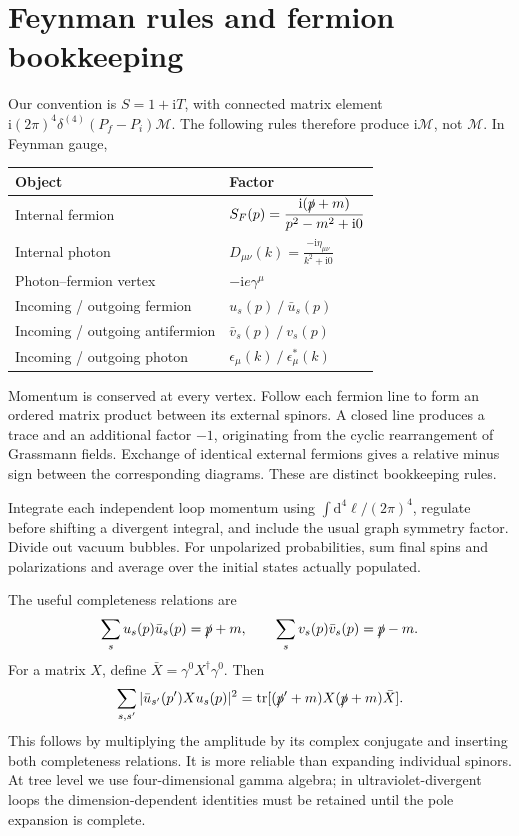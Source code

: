 \documentclass[11pt]{article}
\newcommand{\dd}{\mathrm d}
\newcommand{\ii}{\mathrm i}
\newcommand{\tr}{\operatorname{tr}}
\newcommand{\module}[1]{\clearpage\section{#1}}
\newcommand{\cM}{\mathcal M}
\begin{document}
\module{Feynman rules and fermion bookkeeping}
Our convention is \(S=1+\ii T\), with connected matrix element
\(\ii(2\pi)^4\delta^{(4)}(P_f-P_i)\cM\). The following rules therefore
produce \(\ii\cM\), not \(\cM\). In Feynman gauge,
\begin{center}
\renewcommand{\arraystretch}{1.35}
\begin{tabular}{ll}
\toprule
Object & Factor \\
\midrule
Internal fermion & \(\displaystyle S_F(p)=\frac{\ii(\slashed p+m)}{p^2-m^2+\ii0}\) \\
Internal photon & \(\displaystyle D_{\mu\nu}(k)=\frac{-\ii\eta_{\mu\nu}}{k^2+\ii0}\) \\
Photon--fermion vertex & \(-\ii e\gamma^\mu\) \\
Incoming / outgoing fermion & \(u_s(p)\ /\ \bar u_s(p)\) \\
Incoming / outgoing antifermion & \(\bar v_s(p)\ /\ v_s(p)\) \\
Incoming / outgoing photon & \(\epsilon_\mu(k)\ /\ \epsilon_\mu^*(k)\) \\
\bottomrule
\end{tabular}
\end{center}
Momentum is conserved at every vertex. Follow each fermion line to form
an ordered matrix product between its external spinors. A closed line
produces a trace and an additional factor \(-1\), originating from the
cyclic rearrangement of Grassmann fields. Exchange of identical external
fermions gives a relative minus sign between the corresponding diagrams.
These are distinct bookkeeping rules.

Integrate each independent loop momentum using
\(\int\dd^4\ell/(2\pi)^4\), regulate before shifting a divergent integral,
and include the usual graph symmetry factor. Divide out vacuum bubbles.
For unpolarized probabilities, sum final spins and polarizations and
average over the initial states actually populated.

The useful completeness relations are
\begin{equation}
 \sum_su_s(p)\bar u_s(p)=\slashed p+m,\qquad
 \sum_sv_s(p)\bar v_s(p)=\slashed p-m.
\end{equation}
For a matrix \(X\), define \(\bar X=\gamma^0X^\dagger\gamma^0\). Then
\begin{equation}
 \sum_{s,s'}|\bar u_{s'}(p')Xu_s(p)|^2
 =\tr[(\slashed p'+m)X(\slashed p+m)\bar X].
 \label{eq:spintrace}
\end{equation}
This follows by multiplying the amplitude by its complex conjugate and
inserting both completeness relations. It is more reliable than expanding
individual spinors. At tree level we use four-dimensional gamma algebra;
in ultraviolet-divergent loops the dimension-dependent identities must
be retained until the pole expansion is complete.
\end{document}
